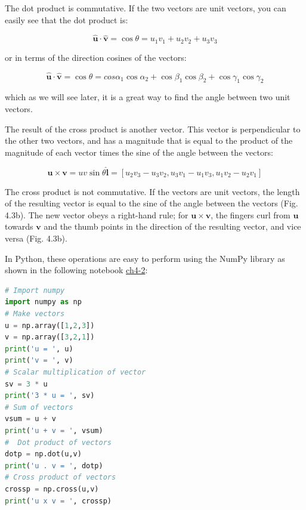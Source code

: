 \documentclass[a4paper , 12pt]{book}
\begin{document}
The dot product is commutative. If the two vectors are unit vectors, you can easily see that the dot product is:

\begin{equation}
    \mathbf{\hat u} \cdot\mathbf{\hat v}=\cos\theta=u_1v_1+u_2v_2+u_3v_3
\end{equation}

or in terms of the direction cosines of the vectors:

\begin{equation}
    \mathbf{\hat u} \cdot\mathbf{\hat v}=\cos\theta=cos\alpha_1\cos\alpha_2+\cos\beta_1\cos\beta_2+\cos\gamma_1\cos\gamma_2
\end{equation}

which as we will see later, it is a great way to find the angle between two unit vectors.

The result of the cross product is another vector. This vector is perpendicular to the other two vectors, and has a magnitude that is equal to the product of the magnitude of each vector times the sine of the angle between the vectors:

\begin{equation}
    \mathbf u\times\mathbf v=uv\sin\theta\mathbf{\hat l}=[u_2v_3-u_3v_2,u_3v_1-u_1v_3,u_1v_2-u_2v_1]
\end{equation}

The cross product is not commutative. If the vectors are unit vectors, the length of the resulting vector is equal to the sine of the angle between the vectors (Fig. 4.3b). The new vector obeys a right-hand rule; for $\mathbf u\times\mathbf v$, the fingers curl from $\mathbf u$ towards $\mathbf v$ and the thumb points in the direction of the resulting vector, and vice versa (Fig. 4.3b).

In Python, these operations are easy to perform using the NumPy library as shown in the following notebook \href{https://github.com/nfcd/compGeo/blob/master/source/notebooks/ch4-2.ipynb}{ch4-2}:

\begin{center}
\begin{lstlisting}[language=Python, frame=single]
# Import numpy
import numpy as np
# Make vectors
u = np.array([1,2,3])
v = np.array([3,2,1])
print('u = ', u)
print('v = ', v)
# Scalar multiplication of vector
sv = 3 * u
print('3 * u = ', sv)
# Sum of vectors
vsum = u + v
print('u + v = ', vsum)
#  Dot product of vectors
dotp = np.dot(u,v)
print('u . v = ', dotp)
# Cross product of vectors
crossp = np.cross(u,v) 
print('u x v = ', crossp)
\end{lstlisting}
\end{center}
\end{document}

